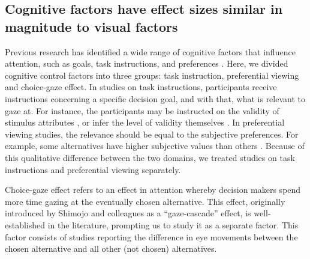 \subsection{Cognitive factors have effect sizes similar in magnitude to visual factors}

Previous research has identified a wide range of cognitive factors that influence attention, such as goals, task instructions, and preferences \citep[for a review see][]{orquin2013a}. Here, we divided cognitive control factors into three groups: task instruction, preferential viewing and choice-gaze effect. In studies on task instructions, participants receive instructions concerning a specific decision goal, and with that, what is relevant to gaze at. For instance, the participants may be instructed on the validity of stimulus attributes \citep{krefeld-schwalb2019a}, or infer the level of validity themselves \citep{bialkova2014a}. In preferential viewing studies, the relevance should be equal to the subjective preferences. For example, some alternatives have higher subjective values than others \citep{kim2012a}. Because of this qualitative difference between the two domains, we treated studies on task instructions and preferential viewing separately. 

Choice-gaze effect refers to an effect in attention whereby decision makers spend more time gazing at the eventually chosen alternative. This effect, originally introduced by Shimojo and colleagues \citep{shimojo2003a} as a ``gaze-cascade'' effect, is well-established in the literature, prompting us to study it as a separate factor. This factor consists of studies reporting the difference in eye movements between the chosen alternative and all other (not chosen) alternatives. 


